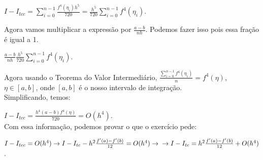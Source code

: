 \documentclass[11pt]{article}
\begin{document}
\(\displaystyle I-I_{tcc} = \sum_{i=0}^{n-1}\frac{f^4(\eta_i)h^5}{720} = 
   \frac{h^5}{720}\sum_{i=0}^{n-1}f^4(\eta_i)\).

Agora vamos multiplicar a expressão por \(\frac{a-b}{nh}\). Podemos fazer
isso pois essa fração é igual a 1.

\(\displaystyle\frac{a-b}{nh}\frac{h^5}{720}\sum_{i=0}^{n-1}f^4(\eta_i)\).

Agora usando o Teorema do Valor Intermediário, 
\(\displaystyle \frac{\sum_{i=0}^{n-1}f^4(\eta_i)}{n} = f^4(\eta)\), \(\eta \in [a, b]\), onde \([a, b]\) é o nosso intervalo de integração.\\

Simplificando, temos: 

\(\displaystyle I-I_{tcc} = \frac{h^4(a-b)f^4(\eta)}{720} = O(h^4)\).\\

Com essa informação, podemos provar o que o exercício pede:

\(I-I_{tcc} = O(h^4) \rightarrow I-I_{tc}-h^2\frac{f'(a)-f'(b)}{12} = O(h^4) \rightarrow \\
   \rightarrow I-I_{tc} = h^2\frac{f'(a)-f'(b)}{12}+O(h^4)\).
\end{document}
